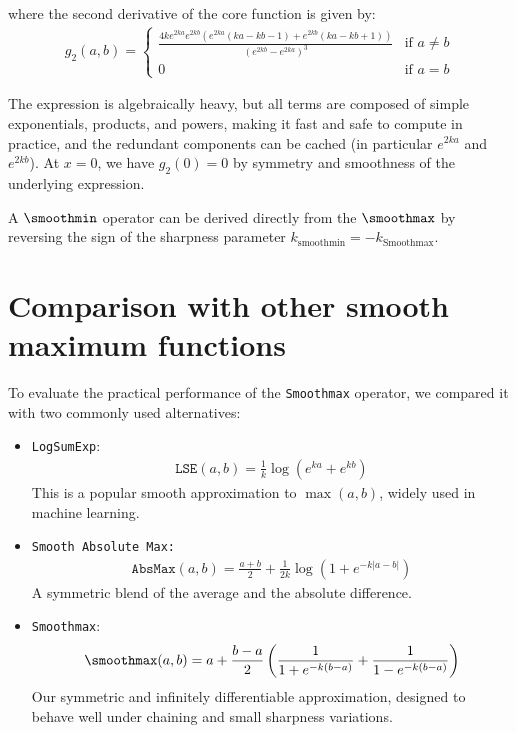where the second derivative of the core function is given by:
\begin{align}
    g_2(a, b) = \begin{cases}
        \frac{4ke^{2ka}e^{2kb} \left( e^{2ka} (ka-kb-1) + e^{2kb}(ka - kb + 1) \right)}{\left(e^{2kb}-e^{2ka} \right)^3} &\text{if } a \neq b \\
        0  &\text{if } a = b
    \end{cases}
\end{align}

The expression is algebraically heavy, but all terms are composed of simple exponentials, products, and powers, making it fast and safe to compute in practice, and the redundant components can be cached (in particular $e^{2ka}$ and $e^{2kb}$). At $x = 0$, we have $g_2(0) = 0$ by symmetry and smoothness of the underlying expression.

A $\smoothmin$ operator can be derived directly from the $\smoothmax$ by reversing the sign of the sharpness parameter $k_{\text{smoothmin}} = - k_{\text{Smoothmax}}$.



\section{Comparison with other smooth maximum functions}
\label{sec:comparison-smoothmax}

To evaluate the practical performance of the \texttt{Smoothmax} operator, we compared it with two commonly used alternatives:

\begin{itemize}
    \item \texttt{LogSumExp}:
    \begin{align}
        \mathrm{\texttt{LSE}}(a, b) = \frac{1}{k} \log\left(e^{k a} + e^{k b}\right)
    \end{align}
    This is a popular smooth approximation to $\max(a, b)$, widely used in machine learning.

    \item \texttt{Smooth Absolute Max:}
    \begin{align}
        \mathrm{\texttt{AbsMax}}(a, b) = \frac{a + b}{2} + \frac{1}{2k} \log\left(1 + e^{-k|a - b|}\right)
    \end{align}
    A symmetric blend of the average and the absolute difference.

    \item \texttt{Smoothmax}:
    \begin{align}
        \smoothmax(a, b) = a + \frac{b - a}{2} \left( \frac{1}{1 + e^{-k(b - a)}} + \frac{1}{1 - e^{-k(b - a)}} \right)
    \end{align}
    Our symmetric and infinitely differentiable approximation, designed to behave well under chaining and small sharpness variations.
\end{itemize}

